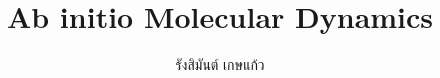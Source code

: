 



\let\cleardoublepage\clearpage

\title{Ab initio Molecular Dynamics}
\author{รังสิมันต์ เกษแก้ว}



% 


\frontmatter





\pagestyle{fancy} %

\mainmatter


\backmatter





